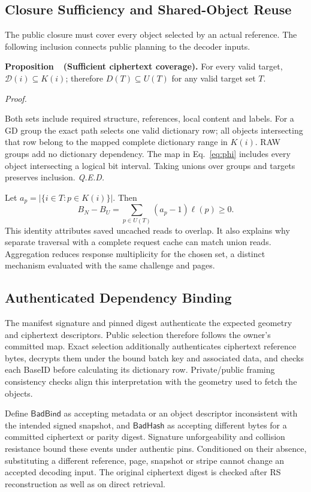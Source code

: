 \documentclass[10pt,journal]{IEEEtran}
\newcounter{proposition}
\newenvironment{proposition}[1]{%
  \refstepcounter{proposition}\par\smallskip\noindent
  \textbf{Proposition~\theproposition\ (#1). }\ignorespaces
}{\par\smallskip}
\newenvironment{claimproof}{\par\noindent\emph{Proof. }\ignorespaces
}{\hfill\textit{Q.E.D.}\par\smallskip}
\begin{document}
\subsection{Closure Sufficiency and Shared-Object Reuse}\label{sec:closure-proof}
The public closure must cover every object selected by an actual reference.
The following inclusion connects public planning to the decoder inputs.
\begin{proposition}{Sufficient ciphertext coverage}\label{prop:closure}
For every valid target, $\mathcal D(i)\subseteq K(i)$; therefore
$D(T)\subseteq U(T)$ for any valid target set $T$.
\end{proposition}
\begin{claimproof}
Both sets include required structure, references, local content and labels.
For a GD group the exact path selects one valid dictionary row; all objects
intersecting that row belong to the mapped complete dictionary range in
$K(i)$. RAW groups add no dictionary dependency. The map in
Eq.~\eqref{eq:phi} includes every object intersecting a logical bit interval.
Taking unions over groups and targets preserves inclusion.
\end{claimproof}

Let $a_p=|\{i\in T:p\in K(i)\}|$. Then
\begin{equation}\label{eq:reuse}
B_N-B_U=\sum_{p\in U(T)}(a_p-1)\ell(p)\geq0.
\end{equation}
This identity attributes saved uncached reads to overlap. It also explains
why separate traversal with a complete request cache can match union reads.
Aggregation reduces response multiplicity for the chosen set, a distinct
mechanism evaluated with the same challenge and pages.

\subsection{Authenticated Dependency Binding}\label{sec:binding}
The manifest signature and pinned digest authenticate the expected geometry
and ciphertext descriptors. Public selection therefore follows the owner's
committed map. Exact selection additionally authenticates ciphertext
reference bytes, decrypts them under the bound batch key and associated
data, and checks each BaseID before calculating its dictionary row.
Private/public framing consistency checks align this interpretation with
the geometry used to fetch the objects.

Define $\mathsf{BadBind}$ as accepting metadata or an object descriptor
inconsistent with the intended signed snapshot, and $\mathsf{BadHash}$ as
accepting different bytes for a committed ciphertext or parity digest.
Signature unforgeability and collision resistance bound these events under
authentic pins. Conditioned on their absence, substituting a different
reference, page, snapshot or stripe cannot change an accepted decoding input.
The original ciphertext digest is checked after RS reconstruction as well
as on direct retrieval.
\end{document}
